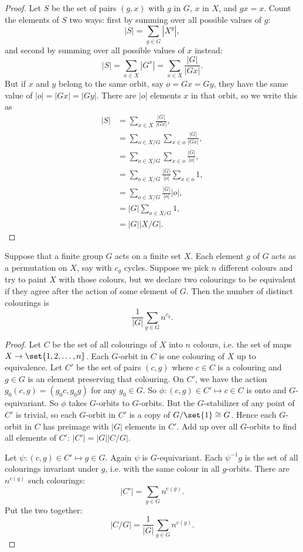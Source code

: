 \begin{proof}
Let \(S\) be the set of pairs \((g,x)\) with \(g\) in \(G\), \(x\) in \(X\), and \(gx=x\).
Count the elements of \(S\) two ways: first by summing over all possible values of \(g\):
\[
|S|=\sum_{g \in G}|X^g|,
\]
and second by summing over all possible values of \(x\) instead:
\[
|S|=\sum_{x \in X} |G^x| = \sum_{x \in X} \frac{|G|}{|Gx|}.
\]
But if \(x\) and \(y\) belong to the same orbit, say \(o=Gx=Gy\), they have the same value of \(|o|=|Gx|=|Gy|\).
There are \(|o|\) elements \(x\) in that orbit, so we write this as
\begin{align*}
|S|
&=\sum_{x \in X} \frac{|G|}{|Gx|},
\\
&=\sum_{o \in X/G} \sum_{x \in o} \frac{|G|}{|Gx|},
\\
&=\sum_{o \in X/G} \sum_{x \in o} \frac{|G|}{|o|},
\\
&=\sum_{o \in X/G} \frac{|G|}{|o|} \sum_{x \in o} 1,
\\
&=\sum_{o \in X/G} \frac{|G|}{|o|} |o|,
\\
&=|G| \sum_{o \in X/G} 1,
\\
&=|G| |X/G|.
\end{align*}
\end{proof}
\begin{theorem}
Suppose that a finite group \(G\) acts on a finite set \(X\).
Each element \(g\) of \(G\) acts as a permutation on \(X\), say with \(c_g\) cycles.
Suppose we pick \(n\) different colours and try to paint \(X\) with those colours, but we declare two colourings to be equivalent if they agree after the action of some element of \(G\).
Then the number of distinct colourings is
\[
\frac{1}{|G|} \sum_{g \in G} n^{c_g}.
\]
\end{theorem}
\begin{proof}
Let \(C\) be the set of all colourings of \(X\) into \(n\) colours, i.e. the set of maps \(X \to \set{1,2,\dots,n}\).
Each \(G\)-orbit in \(C\) is one colouring of \(X\) up to equivalence.
Let \(C'\) be the set of pairs \((c,g)\) where \(c \in C\) is a colouring and \(g \in G\) is an element preserving that colouring.
On \(C'\), we have the action \(g_0(c,g)=(g_0c,g_0g)\) for any \(g_0 \in G\).
So \(\phi\colon (c,g) \in C' \mapsto c \in C\) is onto and \(G\)-equivariant.
So \(\phi\) takes \(G\)-orbits to \(G\)-orbits.
But the \(G\)-stabilizer of any point of \(C'\) is trivial, so each \(G\)-orbit in \(C'\) is a copy of \(G/\set{1} \cong G\).
Hence each \(G\)-orbit in \(C\) has preimage with \(|G|\) elements in \(C'\).
Add up over all \(G\)-orbits to find all elements of \(C'\): \(|C'|=|G||C/G|\).

Let \(\psi\colon (c,g) \in C' \mapsto g \in G\).
Again \(\psi\) is \(G\)-equivariant.
Each \(\psi^{-1}g\) is the set of all colourings invariant under \(g\), i.e. with the same colour in all \(g\)-orbits.
There are \(n^{c(g)}\) such colourings:
\[
|C'|=\sum_{g \in G} n^{c(g)}.
\]
Put the two together:
\[
|C/G|=\frac{1}{|G|} \sum_{g \in G} n^{c(g)}.
\]
\end{proof}
